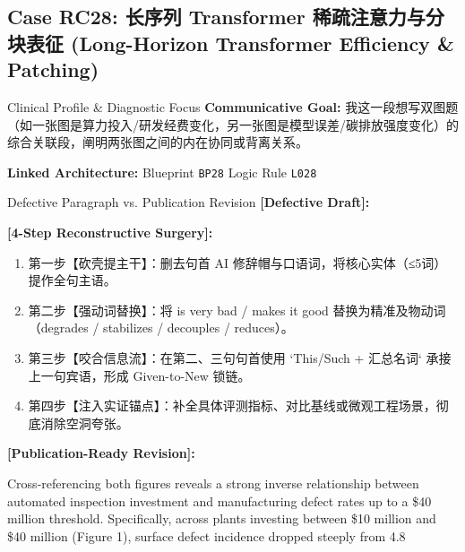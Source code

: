 \subsection{Case RC28: 长序列 Transformer 稀疏注意力与分块表征 (Long-Horizon Transformer Efficiency \& Patching)}\label{case:RC28}
\begin{ConceptBox}{Clinical Profile \& Diagnostic Focus}
\textbf{Communicative Goal:} 我这一段想写双图题（如一张图是算力投入/研发经费变化，另一张图是模型误差/碳排放强度变化）的综合关联段，阐明两张图之间的内在协同或背离关系。\par
\textbf{Linked Architecture:} Blueprint \texttt{BP28} \enspace\textbar\enspace Logic Rule \texttt{L028}
\end{ConceptBox}
\begin{ExampleBox}{Defective Paragraph vs. Publication Revision}
\textbf{\color{TargetHighlight}[Defective Draft]:}\par
{}\par\vspace{6pt}
\textbf{\color{AcadForest}[4-Step Reconstructive Surgery]:}
\begin{enumerate}[label=\textbf{\color{AcadNavy}Step \arabic*:}, leftmargin=2em]
  \item 第一步【砍壳提主干】：删去句首 AI 修辞帽与口语词，将核心实体（≤5词）提作全句主语。
  \item 第二步【强动词替换】：将 is very bad / makes it good 替换为精准及物动词（degrades / stabilizes / decouples / reduces）。
  \item 第三步【咬合信息流】：在第二、三句句首使用 `This/Such + 汇总名词` 承接上一句宾语，形成 Given-to-New 锁链。
  \item 第四步【注入实证锚点】：补全具体评测指标、对比基线或微观工程场景，彻底消除空洞夸张。
\end{enumerate}\vspace{4pt}
\textbf{\color{AcadNavy}[Publication-Ready Revision]:}\par
Cross-referencing both figures reveals a strong inverse relationship between automated inspection investment and manufacturing defect rates up to a \$40 million threshold. Specifically, across plants investing between \$10 million and \$40 million (Figure 1), surface defect incidence dropped steeply from 4.8%
\end{ExampleBox}
